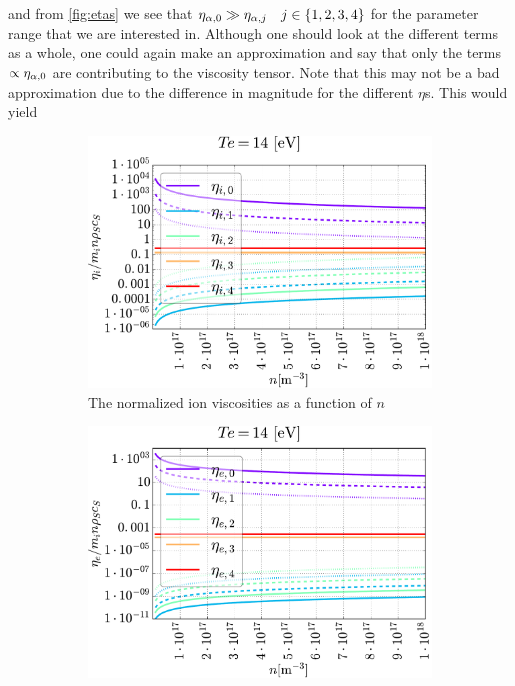 %
and from \cref{fig:etas} we see that $\eta_{\alpha,0} \gg \eta_{\alpha,j} \quad j \in \{1,2,3,4\}$ for the parameter range that we are interested in.
Although one should look at the different terms as a whole, one could again make an approximation and say that only the terms $\propto \eta_{\alpha,0}$ are contributing to the viscosity tensor.
Note that this may not be a bad approximation due to the difference in magnitude for the different $\eta$s.
This would yield
%
\begin{figure}[t!]
    \centering
    \begin{subfigure}[t]{0.45\textwidth}
        \centering
        \includegraphics[width=1.0\textwidth]{fig/etaINScan}
        \caption{The normalized ion viscosities as a function of $n$}
    \end{subfigure}%
    \hfill
    \begin{subfigure}[t]{0.45\textwidth}
        \centering
        \includegraphics[width=1.0\textwidth]{fig/etaENScan}

\end{subfigure}
\end{figure}
